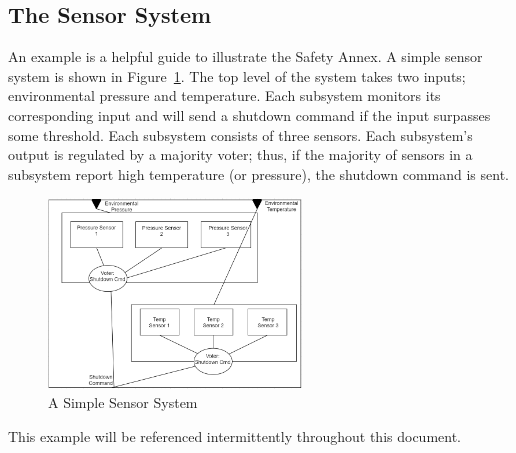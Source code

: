 \subsection{The Sensor System}
\label{sec:sensorExample}
An example is a helpful guide to illustrate the Safety Annex. A simple sensor system is shown in Figure~\ref{fig:sensorSys}. The top level of the system takes two inputs; environmental pressure and temperature. Each subsystem monitors its corresponding input and will send a shutdown command if the input surpasses some threshold. Each subsystem consists of three sensors. Each subsystem's output is regulated by a majority voter; thus, if the majority of sensors in a subsystem report high temperature (or pressure), the shutdown command is sent. 

\begin{figure}[h]
	\centering
	\includegraphics[width=0.6\textwidth]{images/two_sensors.PNG}
	\caption{A Simple Sensor System}
	\label{fig:sensorSys}
\end{figure}

\noindent
This example will be referenced intermittently throughout this document.  

